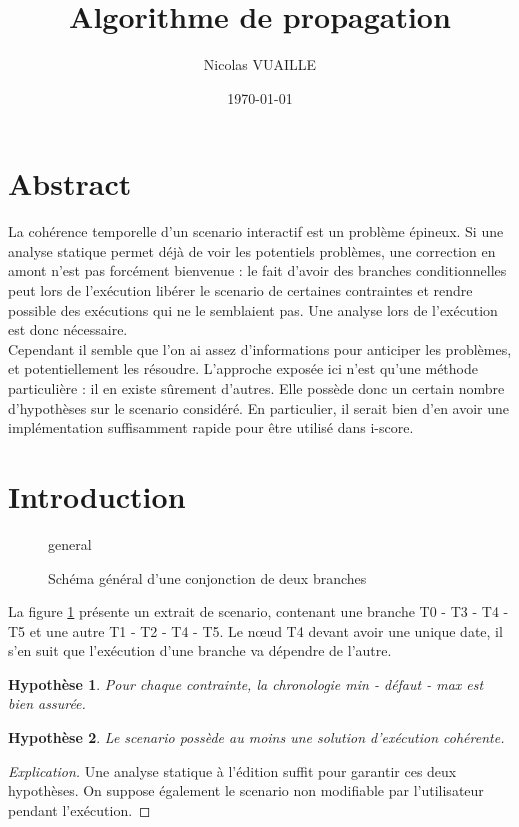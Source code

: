 \documentclass[10pt,a4paper]{article}
\author{Nicolas VUAILLE}
\title{Algorithme de propagation}
\date{\today}
\newtheorem{presup}{Hypothèse}
\begin{document}
\maketitle

\section*{Abstract}

La cohérence temporelle d'un scenario interactif est un problème épineux. Si une analyse statique permet déjà de voir les potentiels problèmes, une correction en amont n'est pas forcément bienvenue : le fait d'avoir des branches conditionnelles peut lors de l'exécution libérer le scenario de certaines contraintes et rendre possible des exécutions qui ne le semblaient pas. Une analyse lors de l'exécution est donc nécessaire. \\

Cependant il semble que l'on ai assez d'informations pour anticiper les problèmes, et potentiellement les résoudre. L'approche exposée ici n'est qu'une méthode particulière : il en existe sûrement d'autres. Elle possède donc un certain nombre d'hypothèses sur le scenario considéré. En particulier, il serait bien d'en avoir une implémentation suffisamment rapide pour être utilisé dans i-score. \\

\tableofcontents

\newpage
\section{Introduction}

	\begin{figure}[h]
		\centering
		
		\schemaScenario general
		\caption{Schéma général d'une conjonction de deux branches}
		\label{S:general}
	\end{figure}

La figure \ref{S:general} présente un extrait de scenario, contenant une branche T0 - T3 - T4 - T5 et une autre T1 - T2 - T4 - T5. Le nœud T4 devant avoir une unique date, il s'en suit que l'exécution d'une branche va dépendre de l'autre.

	\begin{presup}
		Pour chaque contrainte, la chronologie min - défaut - max est bien assurée.
		\label{P:Chronologie}
	\end{presup}
	\begin{presup}
		Le scenario possède au moins une solution d'exécution cohérente.
		\label{P:Executabilite}
	\end{presup}
	\begin{proof}[Explication]
		Une analyse statique à l'édition suffit pour garantir ces deux hypothèses. On suppose également le scenario non modifiable par l'utilisateur pendant l'exécution.
	\end{proof}
\end{document}
